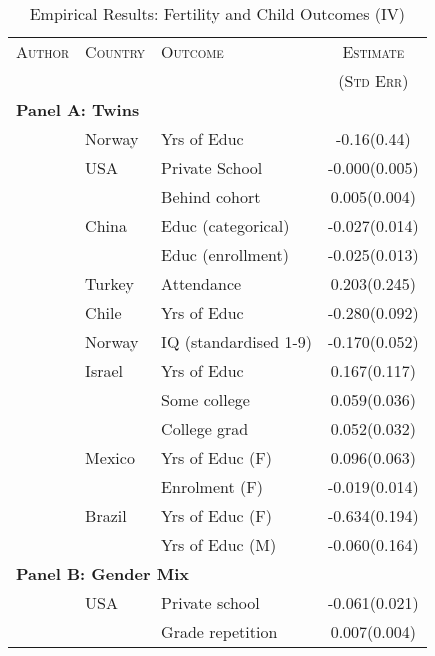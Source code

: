 \begin{table}
\caption{Empirical Results: Fertility and Child Outcomes (IV)}
\label{Ftab:childQQ}
\begin{tabular}{lllc} \toprule
\textsc{Author} & \textsc{Country} & \textsc{Outcome} & \textsc{Estimate} \\
                &                  &                  & \textsc{(Std Err)} \\ \midrule
\multicolumn{4}{l}{\textbf{Panel A: Twins}} \\
\citet{Blacketal2005}            &Norway   & Yrs of Educ         &-0.16(0.44) \\
\citet{Caceres2006}              &USA      &Private School       & -0.000(0.005)\\
                                 &         &Behind cohort        & 0.005(0.004)\\
\citet{Lietal2008}               &China    &Educ (categorical)   & -0.027(0.014)\\
                                 &         &Educ (enrollment)    & -0.025(0.013)\\
\citet{Dayiogluetal2009}         &Turkey   &Attendance           & 0.203(0.245)\\
\citet{Sanhueza2009}             &Chile    &Yrs of Educ          &-0.280(0.092)\\
\citet{Blacketal2010}            &Norway   &IQ (standardised 1-9)& -0.170(0.052)\\
\citet{Angristetal2010}          &Israel   &Yrs of Educ          & 0.167(0.117)\\
                                 &         &Some college         & 0.059(0.036)\\
                                 &         &College grad         & 0.052(0.032)\\
\citet{FitzsimonsMalde2010}      &Mexico   &Yrs of Educ (F)      & 0.096(0.063)\\
                                 &         &Enrolment (F)        &-0.019(0.014)\\
\citet{SouzaPonczek2012}         &Brazil   &Yrs of Educ (F)      & -0.634(0.194)\\
                                 &         &Yrs of Educ (M)      & -0.060(0.164)\\ \midrule
\multicolumn{4}{l}{\textbf{Panel B: Gender Mix}} \\
\citet{ConleyGlauber2006}        &USA      &Private school       &-0.061(0.021) \\
                                 &         &Grade repetition     &0.007(0.004)  \\

\end{tabular}
\end{table}
